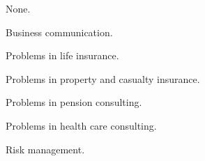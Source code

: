 \documentclass{osucourse}
\begin{document}
\CatalogDescription
\PrerequisitesAndExclusions

\begin{Text}
None.
\end{Text}

\begin{TopicsList}
\item Business communication.
\item Problems in life insurance.
\item Problems in property and casualty insurance.
\item Problems in pension consulting.
\item Problems in health care consulting.
\item Risk management.
\end{TopicsList}
\end{document}

